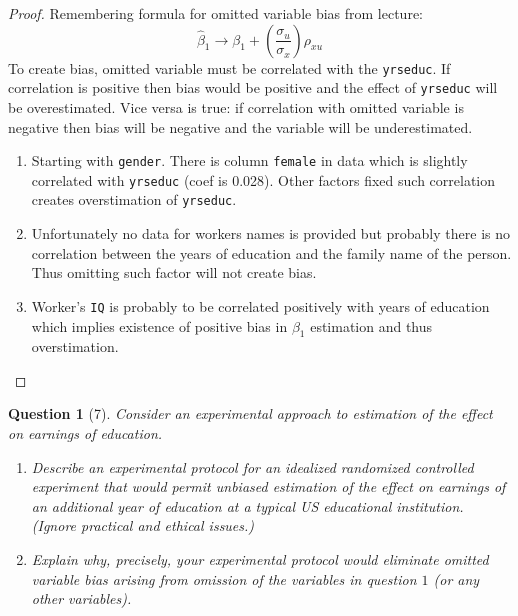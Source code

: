 \documentclass[12pt,reqno]{amsart}
\theoremstyle{plain}
\newcommand{\hb}{\hat\beta}
\newtheorem*{theorem*}{Question}
\begin{document}
\begin{proof}
    Remembering formula for omitted variable bias from lecture:
    \[\hb_1 \to \beta_{1} + \left( \frac{\sigma_u}{\sigma_x} \right)\rho_{xu} \]
    To create bias, omitted variable must be correlated with the \texttt{yrseduc}. If correlation is positive then bias would be positive and the effect of \texttt{yrseduc}
    will be overestimated. Vice versa is true: if correlation with omitted variable is negative then
    bias will be negative and the variable will be underestimated.
    \begin{enumerate}
        \item Starting with \texttt{gender}. There is column \texttt{female} in data which is slightly
              correlated with \texttt{yrseduc} (coef is 0.028). Other factors fixed such correlation creates
              overstimation of \texttt{yrseduc}.
        \item Unfortunately no data for workers names is provided but probably there is no correlation
              between the years of education and the family name of the person. Thus omitting such factor
              will not create bias.
        \item Worker's \texttt{IQ} is probably to be correlated positively with years of education
              which implies existence of positive bias in $ \beta_{1} $ estimation and thus overstimation.
    \end{enumerate}
\end{proof}
\begin{theorem*}[7]
    \normalfont
    Consider an experimental approach to estimation of the effect on earnings of education.
    \begin{enumerate}
        \item Describe an experimental protocol for an idealized randomized controlled experiment that
              would permit unbiased estimation of the effect on earnings of an additional year of education
              at a typical US educational institution. (Ignore practical and ethical issues.)
        \item Explain why, precisely, your experimental protocol would eliminate omitted variable bias
              arising from omission of the variables in question $ 1 $ (or any other variables).
    \end{enumerate}
\end{theorem*}
\end{document}
